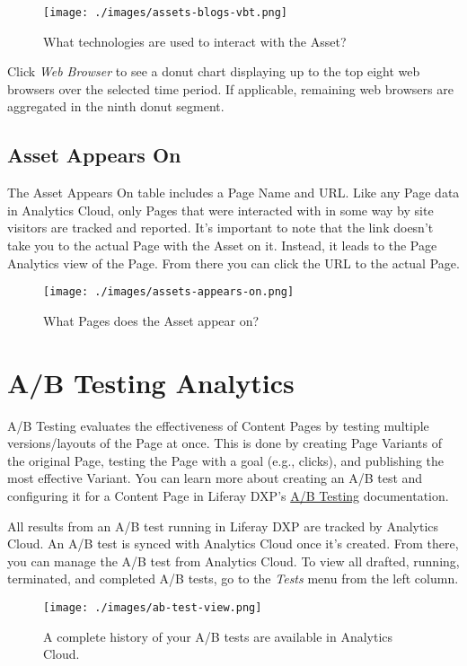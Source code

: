 \begin{figure}
\centering
\texttt{[image: ./images/assets-blogs-vbt.png]}
\caption{What technologies are used to interact with the Asset?}
\end{figure}

Click \emph{Web Browser} to see a donut chart displaying up to the top
eight web browsers over the selected time period. If applicable,
remaining web browsers are aggregated in the ninth donut segment.

\subsection{Asset Appears On}\label{asset-appears-on-3}

The Asset Appears On table includes a Page Name and URL. Like any Page
data in Analytics Cloud, only Pages that were interacted with in some
way by site visitors are tracked and reported. It's important to note
that the link doesn't take you to the actual Page with the Asset on it.
Instead, it leads to the Page Analytics view of the Page. From there you
can click the URL to the actual Page.

\begin{figure}
\centering
\texttt{[image: ./images/assets-appears-on.png]}
\caption{What Pages does the Asset appear on?}
\end{figure}

\section{A/B Testing Analytics}\label{ab-testing-analytics}

A/B Testing evaluates the effectiveness of Content Pages by testing
multiple versions/layouts of the Page at once. This is done by creating
Page Variants of the original Page, testing the Page with a goal (e.g.,
clicks), and publishing the most effective Variant. You can learn more
about creating an A/B test and configuring it for a Content Page in
Liferay DXP's \href{/docs/7-2/user/-/knowledge_base/u/a-b-testing}{A/B
Testing} documentation.

All results from an A/B test running in Liferay DXP are tracked by
Analytics Cloud. An A/B test is synced with Analytics Cloud once it's
created. From there, you can manage the A/B test from Analytics Cloud.
To view all drafted, running, terminated, and completed A/B tests, go to
the \emph{Tests} menu from the left column.

\begin{figure}
\centering
\texttt{[image: ./images/ab-test-view.png]}
\caption{A complete history of your A/B tests are available in Analytics
Cloud.}
\end{figure}

